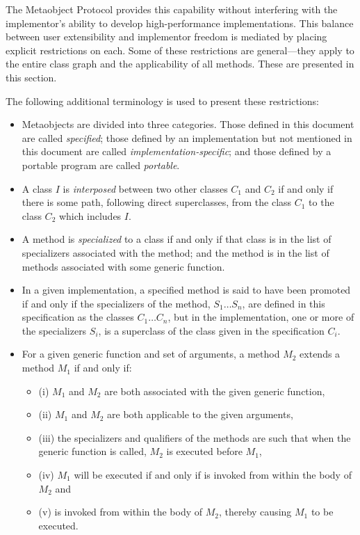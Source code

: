 The Metaobject Protocol provides this capability without interfering with the
implementor's ability to develop high-performance implementations. This balance
between user extensibility and implementor freedom is mediated by placing
explicit restrictions on each. Some of these restrictions are general---they
apply to the entire class graph and the applicability of all methods. These are
presented in this section. 

The following additional terminology is used to present these restrictions:


  \begin{itemize}
  \item 
    Metaobjects are divided into three categories. Those defined in this
    document are called \emph{specified}; those defined by an implementation but not
    mentioned in this document are called \emph{implementation-specific}; and those
    defined by a portable program are called \emph{portable}. 

  \item 
    A class $I$ is \emph{interposed} between two other classes $C_1$ and $C_2$ if and only if
    there is some path, following direct superclasses, from the class $C_1$ to the
    class $C_2$ which includes $I$. 
  \item 
    A method is \emph{specialized} to a class if and only if that class is in the list
    of specializers associated with the method; and the method is in the list of
    methods associated with some generic function. 
  \item 
    In a given implementation, a specified method is said to have been promoted
    if and only if the specializers of the method, $S_1 \ldots S_n$, are defined in
    this specification as the classes $C_1 \ldots C_n$, but in the implementation, one
    or more of the specializers $S_i$, is a superclass of the class given in the
    specification $C_i$. 
  \item 
    For a given generic function and set of arguments, a method $M_2$ extends a
    method $M_1$ if and only if: 

    \begin{itemize}
    \item 
        (i) $M_1$ and $M_2$ are both associated with the given generic function, 
      \item 
        (ii) $M_1$ and $M_2$ are both applicable to the given arguments, 
      \item 
        (iii) the specializers and qualifiers of the methods are such that when
        the generic function is called, $M_2$ is executed before $M_1$, 
      \item 
        (iv) $M_1$ will be executed if and only if  is invoked from
        within the body of $M_2$ and 
      \item 
        (v) is invoked from within the body of $M_2$, thereby
        causing $M_1$ to be executed. 
      \end{itemize}


\end{itemize}
